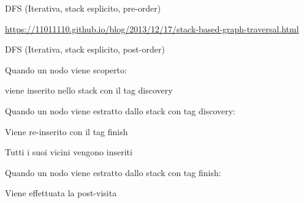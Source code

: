 \begin{frame}[shrink=15]{DFS (Iterativa, stack esplicito, pre-order)}

\vspace{-12pt}

\tiny
\url{https://11011110.github.io/blog/2013/12/17/stack-based-graph-traversal.html}

\end{frame}

\begin{frame}{DFS (Iterativa, stack esplicito, post-order)}

\BIL
\item Quando un nodo viene scoperto:
  \BI
  \item  viene inserito nello stack con il tag \textsf{discovery}
  \EI
\item Quando un nodo viene estratto dallo stack con tag \textsf{discovery}:
  \BI
  \item Viene re-inserito con il tag \textsf{finish}
  \item Tutti i suoi vicini vengono inseriti
  \EI
\item Quando un nodo viene estratto dallo stack con tag \textsf{finish}:
  \BI
  \item Viene effettuata la post-visita
  \EI
\EIL
\end{frame}



